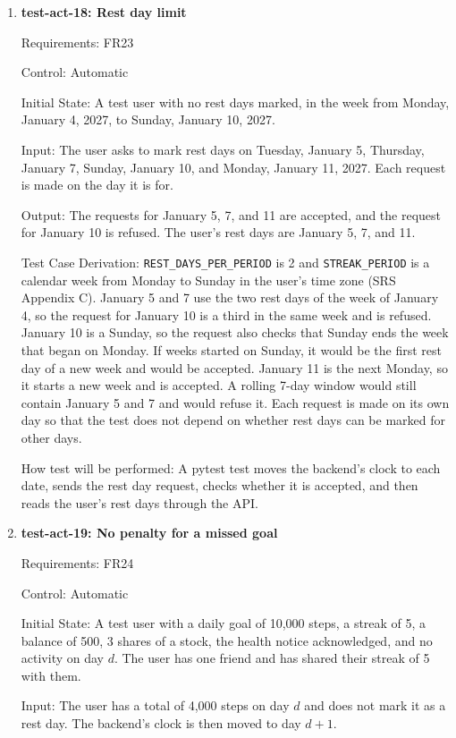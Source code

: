 \documentclass[12pt, titlepage]{article}
\begin{document}
\begin{enumerate}
How test will be performed: As in test-act-15.

\item{\textbf{test-act-18: Rest day limit}\\}

Requirements: FR23

Control: Automatic

Initial State: A test user with no rest days marked, in the week from Monday,
January 4, 2027, to Sunday, January 10, 2027.

Input: The user asks to mark rest days on Tuesday, January 5, Thursday, January
7, Sunday, January 10, and Monday, January 11, 2027. Each request is made on
the day it is for.

Output: The requests for January 5, 7, and 11 are accepted, and the request
for January 10 is refused. The user's rest days are January 5, 7, and 11.

Test Case Derivation: \texttt{REST\_DAYS\_PER\_PERIOD} is 2 and
\texttt{STREAK\_PERIOD} is a calendar week from Monday to Sunday in the user's
time zone (SRS Appendix C). January 5 and 7 use the two rest days of the week
of January 4, so the request for January 10 is a third in the same week and
is refused. January 10 is a Sunday, so the request also checks that Sunday
ends the week that began on Monday. If weeks started on Sunday, it would be
the first rest day of a new week and would be accepted. January 11 is the next
Monday, so it starts a new week and is accepted. A rolling 7-day window would
still contain January 5 and 7 and would refuse it. Each request is made on its
own day so that the test does not depend on whether rest days can be marked
for other days.

How test will be performed: A pytest test moves the backend's clock to each
date, sends the rest day request, checks whether it is accepted, and then
reads the user's rest days through the API.

\item{\textbf{test-act-19: No penalty for a missed goal}\\}

Requirements: FR24

Control: Automatic

Initial State: A test user with a daily goal of 10,000 steps, a streak of 5, a
balance of 500, 3 shares of a stock, the health notice acknowledged, and no
activity on day $d$. The user has one friend and has shared their streak of 5
with them.

Input: The user has a total of 4,000 steps on day $d$ and does not mark it as
a rest day. The backend's clock is then moved to day $d+1$.


\end{enumerate}
\end{document}
